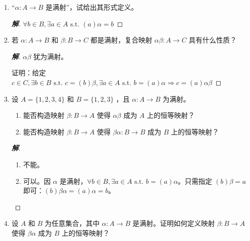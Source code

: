 \documentclass[12pt]{ctexart}
\newenvironment{solution}{\begin{proof}[\indent\bf 解]}{\end{proof}}
\begin{document}
{\begin{enumerate}
  \begin{solution}
    对于 $(A)\alpha$ 中的元素$(x)\alpha$，只需令 $ \left( (x)\alpha \right)\beta = x$；对于剩余的元素，随意指定其象即可。
  \end{solution}

  此时映射 \(\beta\) 称为 \(\alpha\) 的右逆。因此单射具有右逆。
\item  “\(\alpha  : A \rightarrow  B\) 是满射”，试给出其形式定义。

  \begin{solution}
    $\forall b \in B, \exists a \in A \text{ s.t. }  (a)\alpha = b$
  \end{solution}

  
\item 若 \(\alpha  : A \rightarrow  B\) 和 \(\beta  : B \rightarrow  C\) 都是满射，复合映射 \({\alpha \beta } : A \rightarrow  C\) 具有什么性质？

  \begin{solution}
    $\alpha\beta$ 犹为满射。

    证明：给定 $c \in C, \exists b \in B \text{ s.t. }  c = (b)\beta, \exists a \in A \text{ s.t. }  b= (a)\alpha \Rightarrow c = (a)\alpha\beta$
  \end{solution}

  
\item 设 \(A = \{ 1,2,3,4\}\) 和 \(B = \{ 1,2,3\}\) ，且 \(\alpha  : A \rightarrow  B\) 为满射。
\begin{enumerate}
\item 能否构造映射 \(\beta  : B \rightarrow  A\) 使得 \({\alpha \beta }\) 成为 \(A\) 上的恒等映射？
\item 能否构造映射 \(\beta  : B \rightarrow  A\) 使得 \({\beta \alpha } : B \rightarrow  B\) 成为 \(B\) 上的恒等映射？
\end{enumerate}

\begin{solution}
\begin{enumerate}
\item 不能。
\item 可以。因 $\alpha$ 是满射，$\forall b \in B, \exists a \in A \text{ s.t. }  b = (a)\alpha$。只需指定 $(b)\beta = a$ 即可：$(b)\beta\alpha = (a)\alpha = b$。
\end{enumerate}
\end{solution}

\item 设 \(A\) 和 \(B\) 为任意集合，其中 \(\alpha  : A \rightarrow  B\) 是满射。证明如何定义映射 \(\beta  : B \rightarrow  A\) 使得 \({\beta \alpha }\) 成为 \(B\) 上的恒等映射？


\end{enumerate}}
\end{document}
